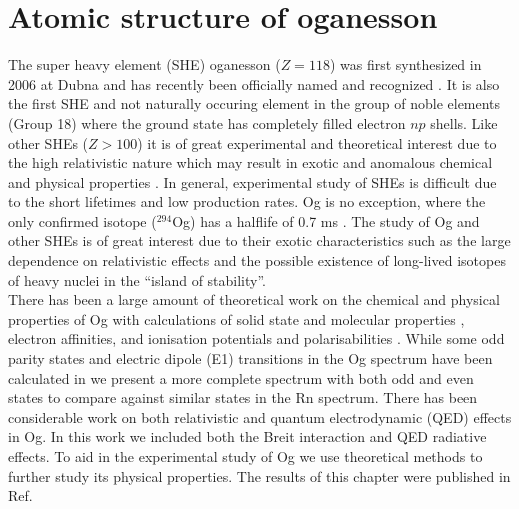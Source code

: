 \documentclass[10pt,a4paper, twoside, openright]{report}
\begin{document}
 \chapter{Atomic structure of oganesson} \label{chap:Og}
The super heavy element (SHE) oganesson ($Z=118$) was first synthesized in 2006 at Dubna \cite{OganessianOg2006} and has recently been officially named and recognized \cite{Karol2016}.  It is also the first SHE and not naturally occuring element in the group of noble elements (Group 18) where the ground state has completely filled electron $np$ shells. Like other SHEs  ($Z>100$) it is of great experimental and theoretical interest due to the high relativistic nature  which may result in exotic and anomalous chemical and physical properties \cite{Pershina2009, Schwerdtfeger2014}. In general, experimental study of SHEs is difficult  due to the short lifetimes and low production rates. Og is no exception, where the only confirmed isotope ($^{294}$Og) has a halflife of 0.7 ms \cite{OganessianOg2006}. The study of Og and other SHEs is of great interest due to their exotic characteristics such as the large dependence on relativistic effects and the possible existence of long-lived isotopes of heavy nuclei in the ``island of stability''. \\
\linebreak
 There has been a large amount of  theoretical work on the chemical and physical properties of Og with calculations of solid state and molecular properties \cite{Kullie2012, Shee2015, Nash1999, Nash2005, Peter2016}, electron affinities\cite{Pitzer1975, EliavOg1996, PershinaOg2008, Hangele2012, Goidenko2003}, and ionisation potentials and polarisabilities \cite{PershinaOg2008, Desclaux1973, Nash2005, Jerabek2018}. While some odd parity states and electric dipole (E1) transitions in the Og spectrum have been calculated in \cite{Indelicato2007} we present a more complete spectrum with both odd and even states to compare against similar states in the Rn spectrum. There has been considerable work on both relativistic and quantum electrodynamic (QED) effects \cite{Pyykko1988, Jerabek2018, Goidenko2003, Eliav2015, Indelicato2007, Thierfelder2010} in Og. In this work we included both the Breit interaction and QED radiative effects. To aid in the experimental study of Og we use  theoretical methods to further study its physical properties.  The results of this chapter were published in Ref. \cite{LDFOg2018}
\end{document}
